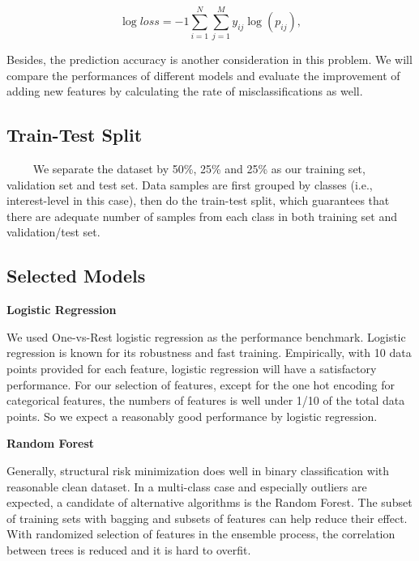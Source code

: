 \documentclass{article}
\begin{document}
$$
\log loss=-1\sum_{i=1}^{N}\sum_{j=1}^{M} y_{ij}\log(p_{ij}),
$$

Besides, the prediction accuracy is another consideration in this problem. We will compare the performances of different models and evaluate the improvement of adding new features by calculating the rate of misclassifications as well.

\subsection{Train-Test Split} \label{train_test_split}

~~~~ We separate the dataset by 50\%, 25\% and 25\%  as our training set, validation set and test set. Data samples are first grouped by classes (i.e., interest-level in this case), then do the train-test split, which guarantees that there are adequate number of samples from each class in both training set and validation/test set. 

\subsection{Selected Models} \label{algos}


\noindent\textbf{\large Logistic Regression}

We used One-vs-Rest logistic regression as the performance benchmark. Logistic regression is known for its robustness and fast training. Empirically, with 10 data points provided for each feature, logistic regression will have a satisfactory performance. For our selection of features, except for the one hot encoding for categorical features, the numbers of features is well under 1/10 of the total data points. So we expect a reasonably good performance by logistic regression. 
\vspace{1.5em}

\noindent\textbf{\large Random Forest}

Generally, structural risk minimization does well in binary classification with reasonable clean dataset. In a multi-class case and especially outliers are expected, a candidate of alternative algorithms is the Random Forest. The subset of training sets with bagging and subsets of features can help reduce their effect.
With randomized selection of features in the ensemble process, the correlation between trees is reduced and it is hard to overfit. 
\vspace{1.0em}
\end{document}
